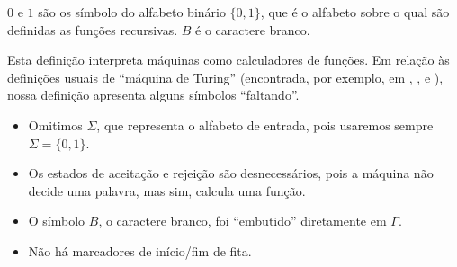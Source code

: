 $0$ e $1$ são os símbolo do alfabeto binário $\{0, 1\}$,
que é o alfabeto sobre o qual são definidas as funções recursivas.
$B$ é o caractere branco.

Esta definição interpreta máquinas como calculadores de funções.
Em relação às definições usuais de ``máquina de Turing''
(encontrada, por exemplo,
em \cite[p.~148]{HopcroftUllman1979},
\cite[p.~140]{Sipser2006},
e \cite[p.~6]{Kozen2006}),
nossa definição apresenta alguns símbolos ``faltando''.
\begin{itemize}
    \item Omitimos $\Sigma$, que representa o alfabeto de entrada,
        pois usaremos sempre $\Sigma = \{0, 1\}$.
    \item Os estados de aceitação e rejeição são desnecessários,
        pois a máquina não decide uma palavra,
        mas sim, calcula uma função.
    \item O símbolo $B$, o caractere branco,
        foi ``embutido'' diretamente em $\Gamma$.
    \item Não há marcadores de início/fim de fita.
\end{itemize}
